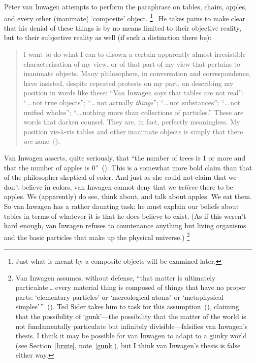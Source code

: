 \documentclass[11pt]{article}
\newenvironment{squote}{\begin{quote}\begin{singlespace}}{\end{singlespace}\end{quote}}
\begin{document}
\begin{spacing}{1.5}
Peter van Inwagen attempts to perform the paraphrase on tables, chairs, apples, and every other (inanimate) `composite' object.%
%
\footnote{Just what is meant by a composite objects will be examined later.}
%
\ He takes pains to make clear that his denial of these things is by no means limited to their objective reality, but to their subjective reality as well (if such a distinction there be):
\begin{squote}
I want to do what I can to disown a certain apparently almost irresistible characterization of my view, or of that part of my view that pertains to inanimate objects. Many philosophers, in conversation and correspondence, have insisted, despite repeated protests on my part, on describing my position in words like these: ``Van Inwagen says that tables are not real''; ``\ldots\,not true objects''; ``\ldots\,not actually {\em things}''; ``\ldots\,not substances''; ``\ldots\,not unified wholes''; ``\ldots\,nothing more than collections of particles.'' These are words that darken counsel. They are, in fact, perfectly meaningless. My position vis-\`{a}-vis tables and other inanimate objects is simply that there {\em are} none~(\citeyear[99]{inwagen1995}).
\end{squote}
Van Inwagen asserts, quite seriously, that ``the number of trees is 1 or more and that the number of apples is 0''~(\citeyear[711]{inwagen1993b}). This is a somewhat more bold claim than that of the philosopher skeptical of color. And just as she could not claim that we don't believe in colors, van Inwagen cannot deny that we {\em believe} there to be apples. We (apparently) do see, think about, and talk about apples. We eat them. So van Inwagen has a rather daunting task: he must explain our beliefs about tables in terms of whatever it is that he does believe to exist. (As if this weren't hard enough, van Inwagen refuses to countenance anything but living organisms and the basic particles that make up the physical universe.)%
%
\footnote{Van Inwagen assumes, without defense, ``that matter is ultimately particulate\,\ldots\,every material thing is composed of things that have no proper parts: `elementary particles' or `mereological atoms' or `metaphysical simples'\,''~(\citeyear[5]{inwagen1995}). Ted Sider takes him to task for this assumption~(\citeyear{sider1993}), claiming that the possibility of `gunk'---the possibility that the matter of the world is not fundamentally particulate but infinitely divisible---falsifies van Inwagen's thesis. I think it may be possible for van Inwagen to adapt to a gunky world (see Section~\ref{brute}, note~\ref{gunk}), but I think van Inwagen's thesis is false either way.}
%


\end{spacing}
\end{document}
